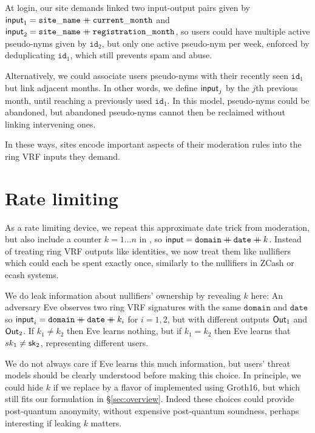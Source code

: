 At login, our site demands linked two input-output pairs given by
$\mathsf{input}_1 = \mathtt{site\_name} \mathbin{+\mkern-10mu+} \mathtt{current\_month}$ and
$\mathsf{input}_2 = \mathtt{site\_name} \mathbin{+\mkern-10mu+} \mathtt{registration\_month}$,
so users could have multiple active pseudo-nyms given by $\mathtt{id}_2$,
but only one active pseudo-nym per week, enforced by deduplicating
$\mathtt{id}_1$, which still prevents spam and abuse.

Alternatively, we could associate users pseudo-nyms with their recently
seen $\mathtt{id}_1$ but link adjacent months.  In other words, we define
$\mathsf{input}_j$ by the $j$th previous month, until reaching a previously used
$\mathtt{id}_1$.  In this model, pseudo-nyms could be abandoned, but
abandoned pseudo-nyms cannot then be reclaimed without linking intervening ones.

In these ways, sites encode important aspects of their moderation rules
into the ring VRF inputs they demand.  


\section{Rate limiting}
\label{sec:app_rate_limits}

As a rate limiting device, we repeat this approximate date trick from
moderation, but also include a counter $k = 1 \ldots n$ in \msg, so
 $\mathsf{input} = \mathtt{domain} \mathbin{+\mkern-10mu+} \mathtt{date} \mathbin{+\mkern-10mu+} k$.
Instead of treating ring VRF outputs like identities,
we now treat them like nullifiers which could each be spent exactly once,
 similarly to the nullifiers in ZCash or ecash systems.

We do leak information about nullifiers' ownership by revealing $k$ here:
%
An adversary Eve observes two ring VRF signatures with the same
$\mathtt{domain}$ and $\mathtt{date}$ so
$\mathsf{input}_i = \mathtt{domain} \mathbin{+\mkern-10mu+} \mathtt{date} \mathbin{+\mkern-10mu+} k_i$
for $i=1,2$, but with different outputs ${\mathsf{Out}}_1$ and ${\mathsf{Out}}_2$.
If $k_1 \ne k_2$ then Eve learns nothing, but if $k_1 = k_2$ then
Eve learns that $sk_1 \ne \mathsf{sk}_2$, representing different users. 

We do not always care if Eve learns this much information, but users'
threat models should be clearly understood before making this choice.
In principle, we could hide $k$ if we replace \PedVRF by a flavor of
\Reval implemented using Groth16, 
 but which still fits our formulation in \S\ref{sec:overview}.
Indeed these \Reval choices could provide post-quantum anonymity, 
without expensive post-quantum soundness, perhaps interesting if leaking $k$ matters.


